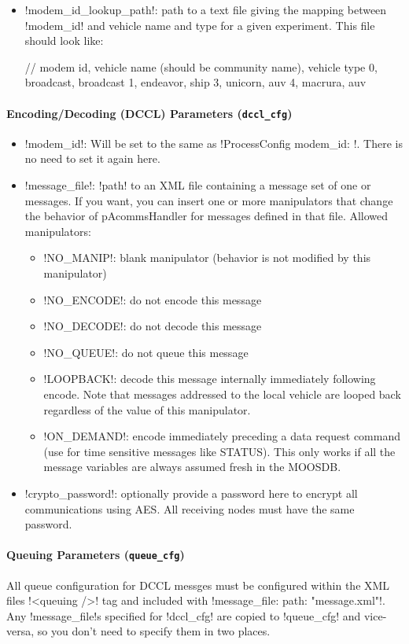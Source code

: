 \begin{itemize}
\item !modem_id_lookup_path!: path to a text file giving the mapping between !modem_id! and vehicle name and type for a given experiment. This file should look like:
\begin{boxedverbatim}
// modem id, vehicle name (should be community name), vehicle type
0, broadcast, broadcast
1, endeavor, ship
3, unicorn, auv
4, macrura, auv
\end{boxedverbatim}
\resetbvlinenumber
\end{itemize}


\paragraph{Encoding/Decoding (DCCL) Parameters (\texttt{dccl\_cfg})} \label{dccl_param}
\begin{itemize}
\item !modem_id!: Will be set to the same as !ProcessConfig { modem_id: } !. There is no need to set it again here.
\item !message_file!: !path! to an XML file containing a message set of one or messages. If you want, you can insert one or more manipulators that change the behavior of pAcommsHandler for messages defined in that file. Allowed manipulators:
\begin{itemize}
\item !NO_MANIP!: blank manipulator (behavior is not modified by this manipulator)
\item !NO_ENCODE!: do not encode this message
\item !NO_DECODE!: do not decode this message
\item !NO_QUEUE!: do not queue this message
\item !LOOPBACK!: decode this message internally immediately following encode. Note that messages addressed to the local vehicle are looped back regardless of the value of this manipulator.
\item !ON_DEMAND!: encode immediately preceding  a data request command (use for time sensitive messages like STATUS). This only works if all the message variables are always assumed fresh in the MOOSDB.
\end{itemize}
\item !crypto_password!: optionally provide a password here to encrypt all communications using AES. All receiving nodes must have the same password.
\end{itemize}

\paragraph{Queuing Parameters (\texttt{queue\_cfg})} \label{sec:xmlqueue}
All queue configuration for DCCL messges must be configured within the XML files !<queuing />! tag and included with !message_file: {path: "message.xml"}!. Any !message_file!s specified for !dccl_cfg! are copied to !queue_cfg! and vice-versa, so you don't need to specify them in two places.

